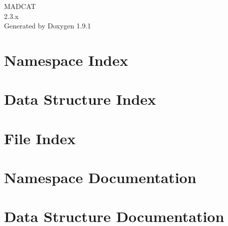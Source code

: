 \let\mypdfximage\pdfximage\def\pdfximage{\immediate\mypdfximage}\documentclass[twoside]{book}
\newcommand{\+}{\discretionary{\mbox{\scriptsize$\hookleftarrow$}}{}{}}
\newcommand{\clearemptydoublepage}{%
  \newpage{\pagestyle{empty}\cleardoublepage}%
}
\begin{document}
\raggedbottom

\hypersetup{pageanchor=false,
             bookmarksnumbered=true,
             pdfencoding=unicode
            }
\begin{titlepage}
\vspace*{7cm}
\begin{center}%
{\Large MADCAT \\[1ex]\large 2.\+3.\+x }\\
\vspace*{1cm}
{\large Generated by Doxygen 1.9.1}\\
\end{center}
\end{titlepage}
\clearemptydoublepage
{}
\tableofcontents
\clearemptydoublepage
{}
\hypersetup{pageanchor=true}

\chapter{Namespace Index}

\chapter{Data Structure Index}

\chapter{File Index}

\chapter{Namespace Documentation}




\chapter{Data Structure Documentation}

























\end{document}
